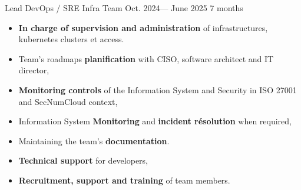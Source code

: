 \jobposition%
{Lead DevOps / SRE}%
{Infra Team}%
{Oct. 2024--- June 2025}%
{7 months}%
{
	\begin{itemize}
	  \item \textbf{In charge of supervision and administration} of infrastructures, kubernetes clusters et access.
		\item Team's roadmaps \textbf{planification} with CISO, software architect
		  and IT director,
		\item \textbf{Monitoring controls} of the Information System and Security in ISO 27001 and SecNumCloud context,
		\item Information System \textbf{Monitoring} and \textbf{incident résolution}
		  when required,
		\item Maintaining the team's \textbf{documentation}.
		\item \textbf{Technical support} for developers,
		\item \textbf{Recruitment, support and training} of team members.
	\end{itemize}
}
